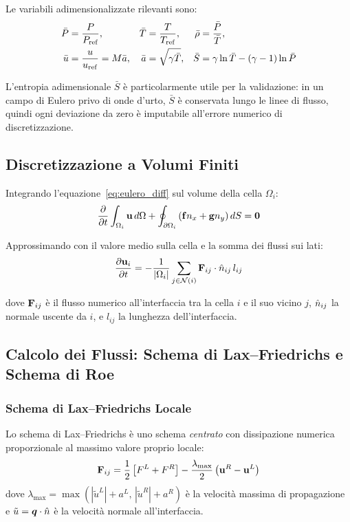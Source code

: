 Le variabili adimensionalizzate rilevanti sono:
\begin{align}
  \bar{P} &= \frac{P}{P_{\rm ref}}, & \bar{T} &= \frac{T}{T_{\rm ref}}, &
  \bar{\rho} &= \frac{\bar{P}}{\bar{T}}, \\
  \bar{u} &= \frac{u}{u_{\rm ref}} = M \bar{a}, &
  \bar{a} &= \sqrt{\gamma \bar{T}}, &
  \bar{S} &= \gamma \ln \bar{T} - (\gamma-1)\ln \bar{P}
\end{align}

L'entropia adimensionale $\bar{S}$ è particolarmente utile per la validazione: in un campo
di Eulero privo di onde d'urto, $\bar{S}$ è conservata lungo le linee di flusso, quindi
ogni deviazione da zero è imputabile all'errore numerico di discretizzazione.

\subsection{Discretizzazione a Volumi Finiti}

Integrando l'equazione~\eqref{eq:eulero_diff} sul volume della cella $\Omega_i$:
\begin{equation}
  \dfrac{\partial }{\partial t} \int_{\Omega_i} \mathbf{u} \, d\Omega
  + \oint_{\partial\Omega_i} \left(\mathbf{f} n_x + \mathbf{g} n_y\right) dS = \bm{0}
\end{equation}

Approssimando con il valore medio sulla cella e la somma dei flussi sui lati:
\begin{equation}
  \dfrac{\partial \mathbf{u}_i}{\partial t} = -\frac{1}{|\Omega_i|}\sum_{j \in \mathcal{N}(i)}
    \mathbf{F}_{ij} \cdot \hat{n}_{ij} \, l_{ij}
  \label{eq:volumi_finiti}
\end{equation}

dove $\mathbf{F}_{ij}$ è il flusso numerico all'interfaccia tra la cella $i$ e il suo vicino $j$,
$\hat{n}_{ij}$ la normale uscente da $i$, e $l_{ij}$ la lunghezza dell'interfaccia.

\subsection{Calcolo dei Flussi: Schema di Lax--Friedrichs e Schema di Roe}

\subsubsection{Schema di Lax--Friedrichs Locale}

Lo schema di Lax--Friedrichs è uno schema \emph{centrato} con dissipazione numerica
proporzionale al massimo valore proprio locale:
\begin{equation}
  \mathbf{F}_{ij} = \frac{1}{2}\left[F^L + F^R\right]
               - \frac{\lambda_{\max}}{2}\left(\mathbf{u}^R - \mathbf{u}^L\right)
\end{equation}
dove $\lambda_{\max} = \max(|\tilde{u}^L|+a^L,\,|\tilde{u}^R|+a^R)$ è la velocità massima
di propagazione e $\tilde{u} = \bm{q}\cdot\hat{n}$ è la velocità normale all'interfaccia.


